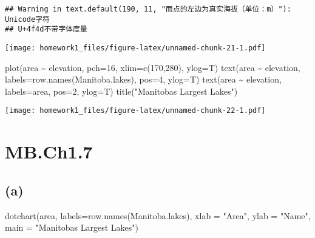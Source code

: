 \documentclass[
]{article}
\newenvironment{Shaded}{\begin{snugshade}}{\end{snugshade}}
\newcommand{\AttributeTok}[1]{\textcolor[rgb]{0.77,0.63,0.00}{#1}}
\newcommand{\DecValTok}[1]{\textcolor[rgb]{0.00,0.00,0.81}{#1}}
\newcommand{\FunctionTok}[1]{\textcolor[rgb]{0.00,0.00,0.00}{#1}}
\newcommand{\NormalTok}[1]{#1}
\newcommand{\SpecialCharTok}[1]{\textcolor[rgb]{0.00,0.00,0.00}{#1}}
\newcommand{\StringTok}[1]{\textcolor[rgb]{0.31,0.60,0.02}{#1}}
\begin{document}
\begin{verbatim}
## Warning in text.default(190, 11, "而点的左边为真实海拔（单位：m）"): Unicode字符
## U+4f4d不带字体度量
\end{verbatim}

\texttt{[image: homework1\_files/figure-latex/unnamed-chunk-21-1.pdf]}

\begin{Shaded}
\begin{Highlighting}[]
\FunctionTok{plot}\NormalTok{(area }\SpecialCharTok{\textasciitilde{}}\NormalTok{ elevation, }\AttributeTok{pch=}\DecValTok{16}\NormalTok{, }\AttributeTok{xlim=}\FunctionTok{c}\NormalTok{(}\DecValTok{170}\NormalTok{,}\DecValTok{280}\NormalTok{), }\AttributeTok{ylog=}\NormalTok{T)}
\FunctionTok{text}\NormalTok{(area }\SpecialCharTok{\textasciitilde{}}\NormalTok{ elevation, }\AttributeTok{labels=}\FunctionTok{row.names}\NormalTok{(Manitoba.lakes), }\AttributeTok{pos=}\DecValTok{4}\NormalTok{, }\AttributeTok{ylog=}\NormalTok{T)}
\FunctionTok{text}\NormalTok{(area }\SpecialCharTok{\textasciitilde{}}\NormalTok{ elevation, }\AttributeTok{labels=}\NormalTok{area, }\AttributeTok{pos=}\DecValTok{2}\NormalTok{, }\AttributeTok{ylog=}\NormalTok{T)}
\FunctionTok{title}\NormalTok{(}\StringTok{"Manitoba\textquotesingle{}s Largest Lakes"}\NormalTok{)}
\end{Highlighting}
\end{Shaded}

\texttt{[image: homework1\_files/figure-latex/unnamed-chunk-22-1.pdf]}

\hypertarget{mb.ch1.7}{%
\section{MB.Ch1.7}\label{mb.ch1.7}}

\hypertarget{a-5}{%
\subsection{(a)}\label{a-5}}

\begin{Shaded}
\begin{Highlighting}[]
\FunctionTok{dotchart}\NormalTok{(area, }\AttributeTok{labels=}\FunctionTok{row.names}\NormalTok{(Manitoba.lakes), }\AttributeTok{xlab =} \StringTok{"Area"}\NormalTok{, }\AttributeTok{ylab =} \StringTok{"Name"}\NormalTok{, }\AttributeTok{main =} \StringTok{"Manitoba\textquotesingle{}s Largest Lakes"}\NormalTok{)}
\end{Highlighting}
\end{Shaded}
\end{document}
